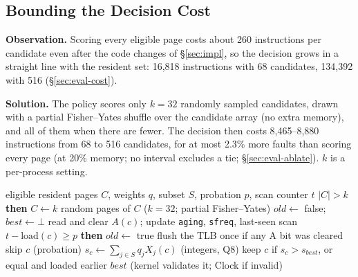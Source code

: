 \documentclass{article}
\newcommand{\clock}{Clock\xspace}
\newcommand{\feat}[1]{\texttt{#1}}         %
\newcommand{\finding}[1]{\textbf{#1}\hspace{0.4em}}
\begin{document}
\subsection{Bounding the Decision Cost}
\label{sec:design-cost}

\finding{Observation.} Scoring every eligible page costs about 260 instructions per
candidate even after the code changes of \S\ref{sec:impl}, so the decision grows in a
straight line with the resident set: 16,818 instructions with 68 candidates, 134,392 with
516 (\S\ref{sec:eval-cost}).

\finding{Solution.} The policy scores only $k=32$ randomly sampled candidates, drawn with
a partial Fisher--Yates shuffle over the candidate array (no extra memory), and all of them
when there are fewer. The decision then costs 8,465--8,880 instructions from 68 to 516
candidates, for at most 2.3\% more faults than scoring every page (at 20\% memory; no
interval excludes a tie; \S\ref{sec:eval-ablate}). $k$ is a per-process setting.

\begin{algorithm}[t]
\caption{Victim selection by the learned score (\texttt{choose\_ml}), one eviction}
\label{alg:choose}
\begin{algorithmic}
 eligible resident pages $C$, weights $q$, subset $S$, probation $p$, scan counter $t$
 $|C| > k$ {\bfseries then} $C \leftarrow k$ random pages of $C$ \hfill ($k=32$; partial Fisher--Yates)
\STATE $old \leftarrow$ false; \ $best \leftarrow \bot$
  \STATE read and clear $A(c)$; update \feat{aging}, \feat{sfreq}, last-seen scan
   $t - \mathrm{load}(c) \ge p$ {\bfseries then} $old \leftarrow$ true
\ENDFOR
\STATE flush the TLB once if any A bit was cleared
    \STATE skip $c$ \hfill (probation)
  \ENDIF
  \STATE $s_c \leftarrow \sum_{j\in S} q_j X_j(c)$ \hfill (integers, Q8)
  \STATE keep $c$ if $s_c > s_{best}$, or equal and loaded earlier
\ENDFOR
{} $best$ \hfill (kernel validates it; \clock if invalid)
\end{algorithmic}
\end{algorithm}
\end{document}
